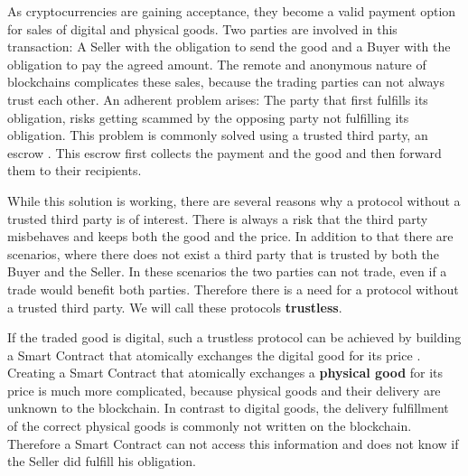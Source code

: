 \documentclass{cacthesis}
\begin{document}
	As cryptocurrencies are gaining acceptance, they become a valid payment option for sales of digital and physical goods. Two parties are involved in this transaction: A Seller with the obligation to send the good and a Buyer with the obligation to pay the agreed amount. The remote and anonymous nature of blockchains complicates these sales, because the trading parties can not always trust each other. An adherent problem arises: 
	The party that first fulfills its obligation, risks getting scammed by the opposing party not fulfilling its obligation.
	This problem is commonly solved using a trusted third party, an escrow \cite{kiayias_escrow_2017}. This escrow first collects the payment and the good and then forward them to their recipients. \newline 
	
	While this solution is working, there are several reasons why a protocol without a trusted third party is of interest. There is always a risk that the third party misbehaves and keeps both the good and the price. In addition to that there are scenarios, where there does not exist a third party that is trusted by both the Buyer and the Seller. In these scenarios the two parties can not trade, even if a trade would benefit both parties. Therefore there is a need for a protocol without a trusted third party. We will call these protocols \textbf{trustless}.\newline
	
	If the traded good is digital, such a trustless protocol can be achieved by building a Smart Contract that atomically exchanges the digital good for its price \cite{asgaonkar_solving_2019}. Creating a Smart Contract that atomically exchanges a \textbf{physical good} for its price is much more complicated, because physical goods and their delivery are unknown to the blockchain. In contrast to digital goods, the delivery fulfillment of the correct physical goods is commonly not written on the blockchain. Therefore a Smart Contract can not access this information and does not know if the Seller did fulfill his obligation. \newline
	
\end{document}
